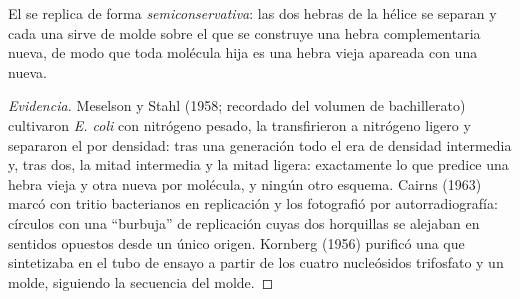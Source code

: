 \begin{proposition}\label{prop:b1:replication-mitosis:semiconservative}
El  se replica de forma \emph{semiconservativa}: las dos hebras de la
hélice se separan y cada una sirve de molde sobre el que se construye una
hebra complementaria nueva, de modo que toda molécula hija es una hebra
vieja apareada con una nueva.
\end{proposition}
\begin{proof}[Evidencia]
Meselson y Stahl (1958; recordado del volumen de bachillerato) cultivaron
\emph{E. coli} con nitrógeno pesado, la transfirieron a nitrógeno ligero y
separaron el  por densidad: tras una generación todo el  era de
densidad intermedia y, tras dos, la mitad intermedia y la mitad ligera:
exactamente lo que predice una hebra vieja y otra nueva por molécula, y
ningún otro esquema. Cairns (1963) marcó con tritio  bacterianos
en replicación y los fotografió por autorradiografía: círculos con una
``burbuja'' de replicación cuyas dos horquillas se alejaban en sentidos
opuestos desde un único origen. Kornberg (1956) purificó una  que
sintetizaba  en el tubo de ensayo a partir de los cuatro nucleósidos
trifosfato y un molde, siguiendo la secuencia del molde.
\end{proof}


